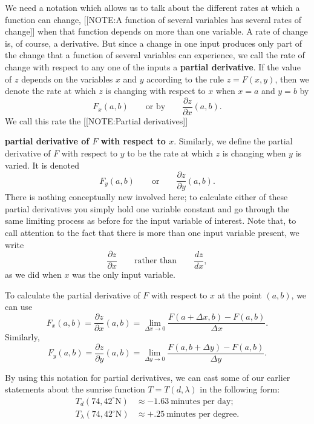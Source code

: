 We need a notation which allows us to talk about the different rates
at which a function can change,
[[NOTE:A function of several variables has several rates of change]]
when that function depends on more than one variable.  A rate of
change is, of course, a derivative.  But since a change in one input
produces only part of the change that a function of several variables
can experience, we call the rate of change with respect to any one of
the inputs a {\bf partial derivative}. If the value of $z$ depends
on the variables $x$ and $y$ according to the rule $z = F(x,y)$, then
we denote the rate at which $z$ is changing with respect to $x$ when
$x = a$ and $y = b$ by
	\[
F_x(a,b) \qquad \mbox{or by} \qquad
		\frac{\partial z}{\partial x}(a,b).
\]
We call this rate the 
	[[NOTE:Partial derivatives]]

{\bf partial derivative of \boldmath $F$ with respect to \boldmath $x$}.  Similarly, we define the partial derivative of $F$ with respect to $y$ to be the rate at which $z$ is changing when $y$ is varied.  It is denoted
	\[
F_y(a,b) \qquad \mbox{or} \qquad
		\frac{\partial z}{\partial y}(a,b).
\]
There is nothing conceptually new involved here; to calculate either of these partial derivatives you simply hold one variable constant and go through the same limiting process as before for the input variable of interest.  Note that, to call attention to the fact that there is more than one input variable present, we write
	\[
\frac{\partial z}{\partial x} \qquad \mbox{rather than} 
\qquad \frac{dz}{dx},
\]
as we did when $x$ was the only input variable.  

To calculate the partial derivative of $F$ with respect to $x$ at the
point $(a,b)$, we can use
	\[
F_x(a,b) = \frac{\partial z}{\partial x}(a,b) =
	\lim_{\Delta x \rightarrow 0} 
	\frac{F(a + \Delta x,b) - F(a,b)}{\Delta x}.
\]
Similarly,
	\[
F_y(a,b) = \frac{\partial z}{\partial y}(a,b) =
	\lim_{\Delta y \rightarrow 0} 
	\frac{F(a,b+\Delta y) - F(a,b)}{\Delta y}.
\]

By using this notation for partial derivatives, we can cast some of
our earlier statements about the sunrise function $T = T(d, \lambda)$
in the following form:
\begin{align*}
T_d(74, 42^\circ\mbox{N}) &\approx -1.63 \ \mbox{minutes per day}; \\
T_\lambda(74,42^\circ\mbox{N}) &\approx +.25 \ \mbox{minutes per degree}.
\end{align*}


